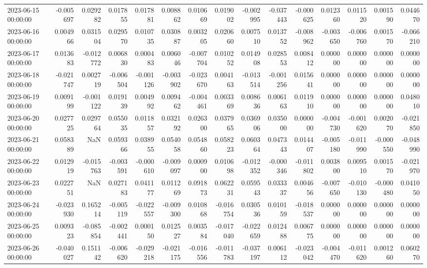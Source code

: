 \begin{tabular}{lrrrrrrrrrrrrrr}
2023-06-15 00:00:00 & -0.005697 & 0.029282 & 0.017855 & 0.017881 & 0.008862 & 0.010669 & 0.019002 & -0.002995 & -0.037443 & -0.000625 & 0.012360 & 0.011520 & 0.001590 & 0.044670 \\
2023-06-16 00:00:00 & 0.004966 & 0.031504 & 0.029570 & 0.010735 & 0.030887 & 0.003205 & 0.020660 & 0.007510 & 0.013752 & -0.008962 & -0.003650 & -0.006760 & 0.001570 & -0.066210 \\
2023-06-17 00:00:00 & 0.013683 & -0.012772 & 0.006830 & 0.000483 & 0.006046 & -0.007704 & 0.010252 & 0.014908 & 0.028553 & 0.008412 & 0.000000 & 0.000000 & 0.000000 & 0.000000 \\
2023-06-18 00:00:00 & -0.021747 & 0.002719 & -0.006504 & -0.001126 & -0.003902 & -0.023670 & 0.004163 & -0.013514 & -0.001256 & 0.015641 & 0.000000 & 0.000000 & 0.000000 & 0.000000 \\
2023-06-19 00:00:00 & 0.009199 & -0.001122 & 0.019139 & 0.004992 & 0.009462 & -0.004461 & 0.003369 & 0.008636 & 0.006163 & 0.011910 & 0.000000 & 0.000000 & 0.000000 & 0.048010 \\
2023-06-20 00:00:00 & 0.027725 & 0.029764 & 0.055035 & 0.011857 & 0.032192 & 0.026300 & 0.037965 & 0.036906 & 0.035000 & 0.000000 & -0.004730 & -0.001620 & 0.002070 & -0.021850 \\
2023-06-21 00:00:00 & 0.058389 & NaN & 0.059366 & 0.038955 & 0.054058 & 0.054860 & 0.058223 & 0.060364 & 0.047343 & 0.014407 & -0.005180 & -0.011990 & -0.000550 & -0.048990 \\
2023-06-22 00:00:00 & 0.012919 & -0.015763 & -0.003591 & -0.000610 & -0.009097 & 0.000900 & 0.010698 & -0.012352 & -0.000346 & -0.011802 & 0.003800 & 0.009510 & 0.001570 & -0.021970 \\
2023-06-23 00:00:00 & 0.022751 & NaN & 0.027183 & 0.041177 & 0.011269 & 0.091873 & 0.062231 & 0.059543 & 0.033337 & 0.004656 & -0.007650 & -0.010130 & -0.000480 & 0.041050 \\
2023-06-24 00:00:00 & -0.023930 & 0.165214 & -0.005119 & -0.022557 & -0.009300 & 0.010868 & -0.016754 & 0.030536 & 0.010159 & -0.018537 & 0.000000 & 0.000000 & 0.000000 & 0.000000 \\
2023-06-25 00:00:00 & 0.009323 & -0.085854 & -0.002441 & 0.000150 & 0.012527 & 0.003584 & -0.017040 & -0.022659 & 0.012488 & 0.006775 & 0.000000 & 0.000000 & 0.000000 & 0.000000 \\
2023-06-26 00:00:00 & -0.040027 & 0.151142 & -0.006620 & -0.029218 & -0.021175 & -0.016556 & -0.011783 & -0.037197 & 0.006112 & -0.023042 & -0.004470 & -0.011620 & 0.001260 & 0.060270 \\

\end{tabular}
